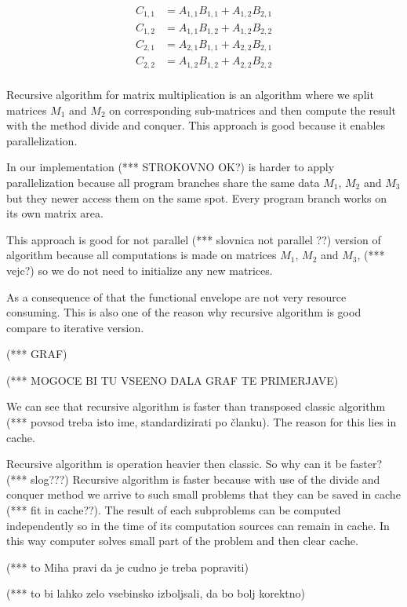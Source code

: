 \documentclass[a4paper,11pt]{article}
\begin{document}
\begin{align*}
C_{1,1} &= A_{1,1}B_{1,1} + A_{1,2}B_{2,1} \\
C_{1,2} &= A_{1,1}B_{1,2} + A_{1,2}B_{2,2} \\
C_{2,1} &= A_{2,1}B_{1,1} + A_{2,2}B_{2,1} \\
C_{2,2} &= A_{1,2}B_{1,2} + A_{2,2}B_{2,2} \\
\end{align*}

Recursive algorithm for matrix multiplication 
is an algorithm where we split matrices
$M_{1}$ and $M_{2}$ on corresponding
sub-matrices and then compute the 
result with the method divide and conquer. 
This approach is good because it 
enables parallelization. 

In our implementation (*** STROKOVNO OK?) 
is harder to apply parallelization because 
all  %
program branches share the same data 
$M_{1}$, $M_{2}$ and $M_{3}$ but they 
newer access them on the same spot. 
Every program branch works on its own 
matrix area. 

This approach is good for not parallel (*** slovnica not parallel ??) 
version of algorithm because all 
computations is made on matrices 
$M_{1}$, $M_{2}$ and $M_{3}$, (*** vejc?)
so we do not need to initialize any new 
matrices. 

As a consequence of that the functional 
envelope are not very resource consuming. 
This is also one of the reason why 
recursive algorithm is good compare to 
iterative version.

(*** GRAF)

(*** MOGOCE BI TU VSEENO DALA GRAF TE PRIMERJAVE)

We can see that recursive algorithm is 
faster than transposed classic algorithm 
(*** povsod treba isto ime, standardizirati po članku). The reason for this lies in 
cache. 

Recursive algorithm is operation heavier 
then classic. So why can it be faster? 
(*** slog???)
Recursive algorithm is faster because 
with use of the divide and conquer method 
we arrive to such small problems that they 
can be saved in cache (*** fit in cache??). 
The result of each subproblems can be computed
independently so in the time of its computation 
sources can remain in cache. 
In this way computer solves small part of the problem and then clear cache. 

(*** to Miha pravi da je cudno je treba popraviti)

(*** to bi lahko zelo vsebinsko izboljsali, 
da bo bolj korektno)
\end{document}
